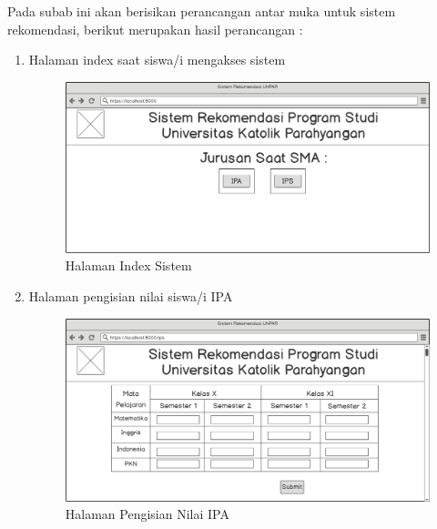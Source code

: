 Pada subab ini akan berisikan perancangan antar muka untuk sistem rekomendasi, berikut merupakan hasil perancangan :

\begin{enumerate}
    \item Halaman index saat siswa/i mengakses sistem
    
    \begin{figure}[H]
        \centering
        \includegraphics[width = 12cm, height =8 cm]{doc/DokumenSkripsi/Gambar/gambar41.png}
        \caption{Halaman Index Sistem}
        \label{fig:gambar41}
    \end{figure}
    
    \item Halaman pengisian nilai siswa/i IPA
    
    \begin{figure}[H]
        \centering
        \includegraphics[width = 12cm, height =8 cm]{doc/DokumenSkripsi/Gambar/gambar42.png}
        \caption{Halaman Pengisian Nilai IPA}
        \label{fig:gambar42}
    \end{figure}
    

\end{enumerate}
